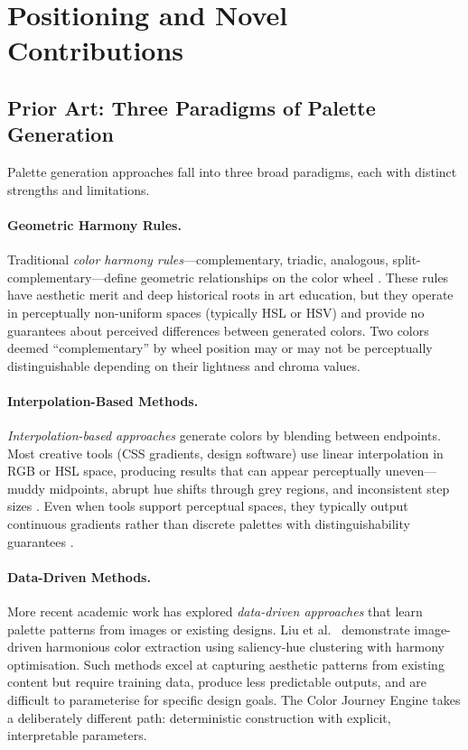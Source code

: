\section{Positioning and Novel Contributions}
\label{sec:positioning}

\subsection*{Prior Art: Three Paradigms of Palette Generation}

Palette generation approaches fall into three broad paradigms, each with distinct strengths and limitations.

\paragraph{Geometric Harmony Rules.}
Traditional \emph{color harmony rules}---complementary, triadic, analogous, split-complementary---define geometric relationships on the color wheel \citep{itten1961}. These rules have aesthetic merit and deep historical roots in art education, but they operate in perceptually non-uniform spaces (typically HSL or HSV) and provide no guarantees about perceived differences between generated colors. Two colors deemed ``complementary'' by wheel position may or may not be perceptually distinguishable depending on their lightness and chroma values.

\paragraph{Interpolation-Based Methods.}
\emph{Interpolation-based approaches} generate colors by blending between endpoints. Most creative tools (CSS gradients, design software) use linear interpolation in RGB or HSL space, producing results that can appear perceptually uneven---muddy midpoints, abrupt hue shifts through grey regions, and inconsistent step sizes \citep{stone2014}. Even when tools support perceptual spaces, they typically output continuous gradients rather than discrete palettes with distinguishability guarantees \citep{programmingdesignsystems2017}.

\paragraph{Data-Driven Methods.}
More recent academic work has explored \emph{data-driven approaches} that learn palette patterns from images or existing designs. Liu et al.\ \citep{liu2013palette} demonstrate image-driven harmonious color extraction using saliency-hue clustering with harmony optimisation. Such methods excel at capturing aesthetic patterns from existing content but require training data, produce less predictable outputs, and are difficult to parameterise for specific design goals. The Color Journey Engine takes a deliberately different path: deterministic construction with explicit, interpretable parameters.


